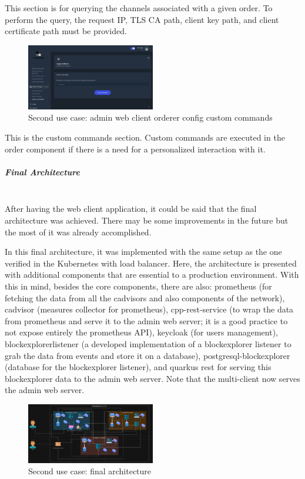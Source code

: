 This section is for querying the channels associated with a given order. To perform the query, the request IP, TLS CA path, client key path, and client certificate path must be provided.

\begin{figure}[H]
    \centering
    \includegraphics[width=0.5\textwidth]{assets/use-case-2/orderer-config-custom-commands.png} %
    \caption{Second use case: admin web client orderer config custom commands}
    \label{fig:sample-image} 
\end{figure}

This is the custom commands section. Custom commands are executed in the order component if there is a need for a personalized interaction with it.

\subparagraph{Final Architecture}\mbox{}\\
After having the web client application, it could be said that the final architecture was achieved. There may be some improvements in the future but the most of it was already accomplished.

In this final architecture, it was implemented with the same setup as the one verified in the Kubernetes with load balancer. Here, the architecture is presented with additional components that are essential to a production environment. With this in mind, besides the core components, there are also: prometheus (for fetching the data from all the cadvisors and also components of the network), cadvisor (measures collector for prometheus), cpp-rest-service (to wrap the data from prometheus and serve it to the admin web server; it is a good practice to not expose entirely the prometheus API), keycloak (for users management), blockexplorerlistener (a developed implementation of a blockexplorer listener to grab the data from events and store it on a database), postgresql-blockexplorer (database for the blockexplorer listener), and quarkus rest for serving this blockexplorer data to the admin web server. Note that the multi-client now serves the admin web server.

\begin{figure}[H]
    \centering
    \includegraphics[width=0.5\textwidth]{assets/use-case-2/final-arch.png} %
    \caption{Second use case: final architecture}
    \label{fig:sample-image} 
\end{figure}


